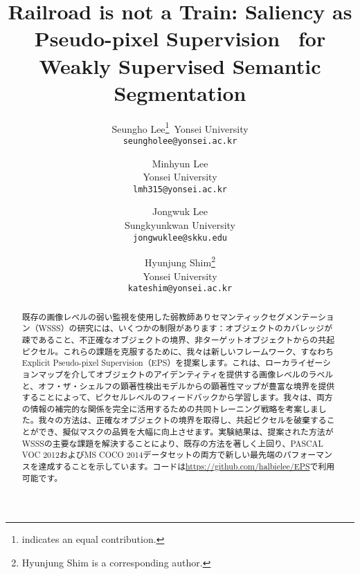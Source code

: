 \documentclass[final]{cvpr}
\begin{document}
\title{Railroad is not a Train: Saliency as Pseudo-pixel Supervision \ for Weakly Supervised Semantic Segmentation}

\author{Seungho Lee\thanks{ indicates an equal contribution.}\
Yonsei University\\
{\tt\small seungholee@yonsei.ac.kr}
\and
Minhyun Lee\footnotemark[1]\\
Yonsei University\\
{\tt\small lmh315@yonsei.ac.kr}
\and 
Jongwuk Lee\\
Sungkyunkwan University\\
{\tt\small jongwuklee@skku.edu}
\and 
Hyunjung Shim\thanks{Hyunjung Shim is a corresponding author.}\\
Yonsei University\\
{\tt\small kateshim@yonsei.ac.kr}
}

\maketitle
\thispagestyle{empty}
\pagestyle{empty}


\begin{abstract}
既存の画像レベルの弱い監視を使用した弱教師ありセマンティックセグメンテーション（WSSS）の研究には、いくつかの制限があります：オブジェクトのカバレッジが疎であること、不正確なオブジェクトの境界、非ターゲットオブジェクトからの共起ピクセル。これらの課題を克服するために、我々は新しいフレームワーク、すなわちExplicit Pseudo-pixel Supervision（EPS）を提案します。これは、ローカライゼーションマップを介してオブジェクトのアイデンティティを提供する画像レベルのラベルと、オフ・ザ・シェルフの顕著性検出モデルからの顕著性マップが豊富な境界を提供することによって、ピクセルレベルのフィードバックから学習します。我々は、両方の情報の補完的な関係を完全に活用するための共同トレーニング戦略を考案しました。我々の方法は、正確なオブジェクトの境界を取得し、共起ピクセルを破棄することができ、擬似マスクの品質を大幅に向上させます。実験結果は、提案された方法がWSSSの主要な課題を解決することにより、既存の方法を著しく上回り、PASCAL VOC 2012およびMS COCO 2014データセットの両方で新しい最先端のパフォーマンスを達成することを示しています。コードは\href{https://github.com/halbielee/EPS}{https://github.com/halbielee/EPS}で利用可能です。
\end{abstract}
\end{document}
